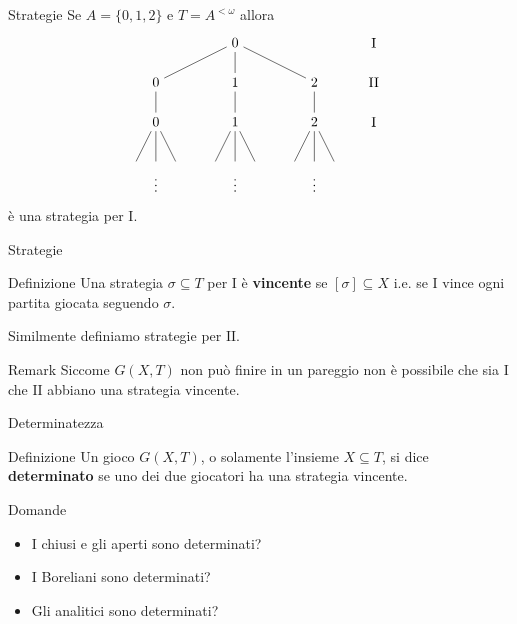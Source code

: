 \documentclass[aspectratio=43]{beamer}
\begin{document}
\begin{frame}{Strategie}
  Se \(A = \{0, 1, 2\}\) e \(T = A^{<\omega}\) allora
  \begin{equation*}
    \begin{tikzpicture}
      \node (1) at (0, 0){\(0\)};
      \node (11) at (-2, -1){\(0\)};
      \node (12) at (0, -1){\(1\)};
      \node (13) at (2, -1){\(2\)};
      \node (21) at (-2, -2){\(0\)};
      \node (22) at (0, -2){\(1\)};
      \node (23) at (2, -2){\(2\)};
      \node (dots) at (0, -3.5){\(\vdots\)};
      \node (dots) at (-2, -3.5){\(\vdots\)};
      \node (dots) at (2, -3.5){\(\vdots\)};

      \node (a) at (3.5, 0){\(\mathrm{I}\)};
      \node (a) at (3.5, -1){\(\mathrm{II}\)};
      \node (a) at (3.5, -2){\(\mathrm{I}\)};

      \draw[-] (1) -- (11) -- (21);
      \draw[-] (1) -- (12) -- (22);
      \draw[-] (1) -- (13) -- (23);

      \draw[-] (21) -- (-2.5, -3);
      \draw[-] (21) -- (-2, -3);
      \draw[-] (21) -- (-1.5, -3);

      \draw[-] (22) -- (-0.5, -3);
      \draw[-] (22) -- (0, -3);
      \draw[-] (22) -- (0.5, -3);

      \draw[-] (23) -- (1.5, -3);
      \draw[-] (23) -- (2, -3);
      \draw[-] (23) -- (2.5, -3);
    \end{tikzpicture}
  \end{equation*}
  è una strategia per \(\mathrm{I}\).
\end{frame}

\begin{frame}{Strategie}
  \begin{block}{Definizione}
    Una strategia \(\sigma \subseteq T\) per \(\mathrm{I}\) è \textbf{vincente} se \([\sigma] \subseteq X\) i.e. se \(\mathrm{I}\) vince ogni partita giocata seguendo \(\sigma\).
  \end{block}
  \pause
  Similmente definiamo strategie per \(\mathrm{II}\).
  \pause
  \begin{block}{Remark}
    Siccome \(G(X, T)\) non può finire in un pareggio non è possibile che sia \(\mathrm{I}\) che \(\mathrm{II}\) abbiano una strategia vincente.
  \end{block}
\end{frame}

\begin{frame}{Determinatezza}
  \begin{block}{Definizione}
    Un gioco \(G(X, T)\), o solamente l'insieme \(X \subseteq T\), si dice \textbf{determinato} se uno dei due giocatori ha una strategia vincente.
  \end{block}
  \pause
  \begin{block}{Domande}
    \begin{itemize}
    \item I chiusi e gli aperti sono determinati?
    \item I Boreliani sono determinati?
    \item Gli analitici sono determinati?
    \end{itemize}
  \end{block}
\end{frame}
\end{document}
